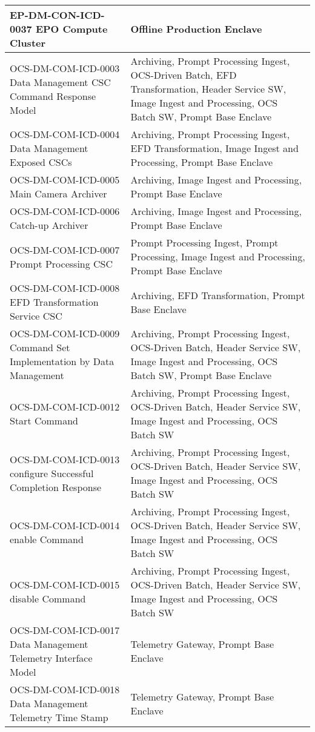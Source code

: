 \begin{longtable}{p{}p{}}
EP-DM-CON-ICD-0037 EPO Compute Cluster & Offline Production Enclave \\ \hline
OCS-DM-COM-ICD-0003 Data Management CSC Command Response Model & Archiving, Prompt Processing Ingest, OCS-Driven Batch, EFD Transformation, Header Service SW, Image Ingest and Processing, OCS Batch SW, Prompt Base Enclave \\ \hline
OCS-DM-COM-ICD-0004 Data Management Exposed CSCs & Archiving, Prompt Processing Ingest, EFD Transformation, Image Ingest and Processing, Prompt Base Enclave \\ \hline
OCS-DM-COM-ICD-0005 Main Camera Archiver & Archiving, Image Ingest and Processing, Prompt Base Enclave \\ \hline
OCS-DM-COM-ICD-0006 Catch-up Archiver & Archiving, Image Ingest and Processing, Prompt Base Enclave \\ \hline
OCS-DM-COM-ICD-0007 Prompt Processing CSC & Prompt Processing Ingest, Prompt Processing, Image Ingest and Processing, Prompt Base Enclave \\ \hline
OCS-DM-COM-ICD-0008 EFD Transformation Service CSC & Archiving, EFD Transformation, Prompt Base Enclave \\ \hline
OCS-DM-COM-ICD-0009 Command Set Implementation by Data Management & Archiving, Prompt Processing Ingest, OCS-Driven Batch, Header Service SW, Image Ingest and Processing, OCS Batch SW, Prompt Base Enclave \\ \hline
OCS-DM-COM-ICD-0012 Start Command & Archiving, Prompt Processing Ingest, OCS-Driven Batch, Header Service SW, Image Ingest and Processing, OCS Batch SW \\ \hline
OCS-DM-COM-ICD-0013 configure Successful Completion Response & Archiving, Prompt Processing Ingest, OCS-Driven Batch, Header Service SW, Image Ingest and Processing, OCS Batch SW \\ \hline
OCS-DM-COM-ICD-0014 enable Command & Archiving, Prompt Processing Ingest, OCS-Driven Batch, Header Service SW, Image Ingest and Processing, OCS Batch SW \\ \hline
OCS-DM-COM-ICD-0015 disable Command & Archiving, Prompt Processing Ingest, OCS-Driven Batch, Header Service SW, Image Ingest and Processing, OCS Batch SW \\ \hline
OCS-DM-COM-ICD-0017 Data Management Telemetry Interface Model & Telemetry Gateway, Prompt Base Enclave \\ \hline
OCS-DM-COM-ICD-0018 Data Management Telemetry Time Stamp & Telemetry Gateway, Prompt Base Enclave \\ \hline

\end{longtable}
